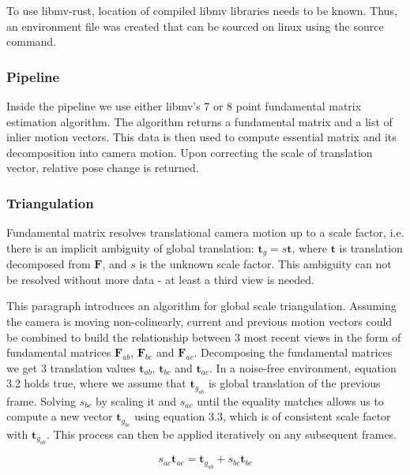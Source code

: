 \documentclass[11pt,english]{report}
\begin{document}
To use libmv-rust, location of compiled libmv libraries needs to be known. Thus, an environment file was created that can be sourced on linux using the source command.

\subsubsection{Pipeline}

Inside the pipeline we use either libmv's 7 or 8 point fundamental matrix estimation algorithm. The algorithm returns a fundamental matrix and a list of inlier motion vectors. This data is then used to compute essential matrix and its decomposition into camera motion. Upon correcting the scale of translation vector, relative pose change is returned.

\subsubsection{Triangulation}

Fundamental matrix resolves translational camera motion up to a scale factor, i.e. there is an implicit ambiguity\cite{hartley_zisserman_2004} of global translation: $\mathbf{t}_g = s\mathbf{t}$, where $\mathbf{t}$ is translation decomposed from $\mathbf{F}$, and $s$ is the unknown scale factor. This ambiguity can not be resolved without more data - at least a third view is needed.

This paragraph introduces an algorithm for global scale triangulation. Assuming the camera is moving non-colinearly, current and previous motion vectors could be combined to build the relationship between 3 most recent views in the form of fundamental matrices $\mathbf{F}_{ab}$, $\mathbf{F}_{bc}$ and $\mathbf{F}_{ac}$. Decomposing the fundamental matrices we get 3 translation values $\mathbf{t}_{ab}$, $\mathbf{t}_{bc}$ and $\mathbf{t}_{ac}$. In a noise-free environment, equation 3.2 holds true, where we assume that $\mathbf{t}_{g_{ab}}$ is global translation of the previous frame. Solving $s_{bc}$ by scaling it and $s_{ac}$ until the equality matches allows us to compute a new vector $\mathbf{t}_{g_{bc}}$ using equation 3.3, which is of consistent scale factor with $\mathbf{t}_{g_{ab}}$. This process can then be applied iteratively on any subsequent frames.

\begin{equation}
	s_{ac}\mathbf{t}_{ac} = \mathbf{t}_{g_{ab}} + s_{bc}\mathbf{t}_{bc}
\end{equation}
\end{document}
